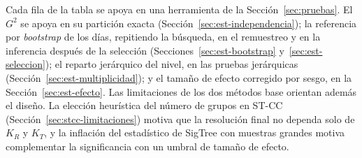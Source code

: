Cada fila de la tabla se apoya en una herramienta de la Sección~\ref{sec:pruebas}. El $G^2$ se apoya en su partición exacta (Sección~\ref{sec:est-independencia}); la referencia por \emph{bootstrap} de los días, repitiendo la búsqueda, en el remuestreo y en la inferencia después de la selección (Secciones~\ref{sec:est-bootstrap} y~\ref{sec:est-seleccion}); el reparto jerárquico del nivel, en las pruebas jerárquicas (Sección~\ref{sec:est-multiplicidad}); y el tamaño de efecto corregido por sesgo, en la Sección~\ref{sec:est-efecto}. Las limitaciones de los dos métodos base orientan además el diseño. La elección
heurística del número de grupos en ST-CC (Sección~\ref{sec:stcc-limitaciones})
motiva que la resolución final no dependa solo de $K_R$ y $K_T$, y la inflación
del estadístico de SigTree con muestras grandes motiva complementar la
significancia con un umbral de tamaño de efecto.
